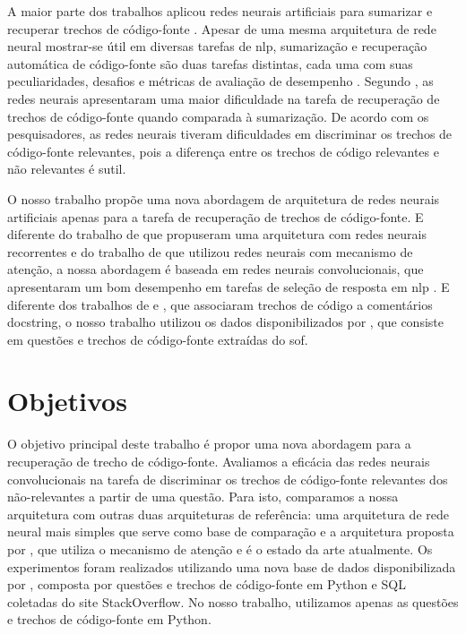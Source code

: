 A maior parte dos trabalhos aplicou redes neurais artificiais para sumarizar e recuperar trechos de código-fonte \citep{iyer-etal-2016-summarizing, Allamanis-bimodal-source-code-natural-language:2015, Chen-bi-variational-autoencoder:2018}. Apesar de uma mesma arquitetura de rede neural mostrar-se 
útil em diversas tarefas de \acrfull{nlp}, sumarização e recuperação automática de código-fonte são duas tarefas distintas, cada uma com suas peculiaridades, desafios e métricas de avaliação de desempenho \citep{allahyari-text-summarization-2017}. Segundo \cite{Allamanis-bimodal-source-code-natural-language:2015}, as redes neurais apresentaram uma maior dificuldade na tarefa de recuperação de trechos de código-fonte quando comparada à sumarização. De acordo com os pesquisadores, as redes neurais tiveram dificuldades em discriminar os trechos de código-fonte relevantes, pois a diferença entre os trechos de código relevantes e não relevantes é sutil.

O nosso trabalho propõe uma nova abordagem de arquitetura de redes neurais artificiais apenas para a tarefa de recuperação de trechos de código-fonte. E diferente do trabalho de \cite{Gu-deep-code-search:2018} que propuseram uma arquitetura com redes neurais recorrentes e do trabalho de \cite{cambronero-deep-learning-code-search:2019} que utilizou redes neurais com mecanismo de atenção, a nossa abordagem é baseada em redes neurais convolucionais, que apresentaram um bom desempenho em tarefas de seleção de resposta em \acrshort{nlp} \citep{feng-2015, tan-lstm-qa, wen-joint-modeling-question-answer-2019}. E diferente dos trabalhos de \cite{Gu-deep-code-search:2018} e \cite{cambronero-deep-learning-code-search:2019}, que associaram trechos de código a comentários \gls{docstring}, o nosso trabalho utilizou os dados disponibilizados por \cite{yao-2018}, que consiste em questões e trechos de código-fonte extraídas do \Gls{sof}.

\section{Objetivos}
\label{sec:objetivo}

O objetivo principal deste trabalho é propor uma nova abordagem  para a recuperação de trecho de código-fonte. Avaliamos a eficácia das redes neurais convolucionais na tarefa de discriminar os trechos de código-fonte relevantes dos não-relevantes a partir de uma questão. Para isto, comparamos a nossa arquitetura com outras duas arquiteturas de referência: uma arquitetura de rede neural mais simples que serve como base de comparação e a arquitetura proposta por \cite{cambronero-deep-learning-code-search:2019}, que utiliza o mecanismo de atenção e é o estado da arte atualmente. Os experimentos foram realizados utilizando uma nova base de dados disponibilizada por \cite{yao-2018}, composta por questões e trechos de código-fonte em Python e SQL coletadas do site StackOverflow. No nosso trabalho, utilizamos apenas as questões e trechos de código-fonte em Python.

